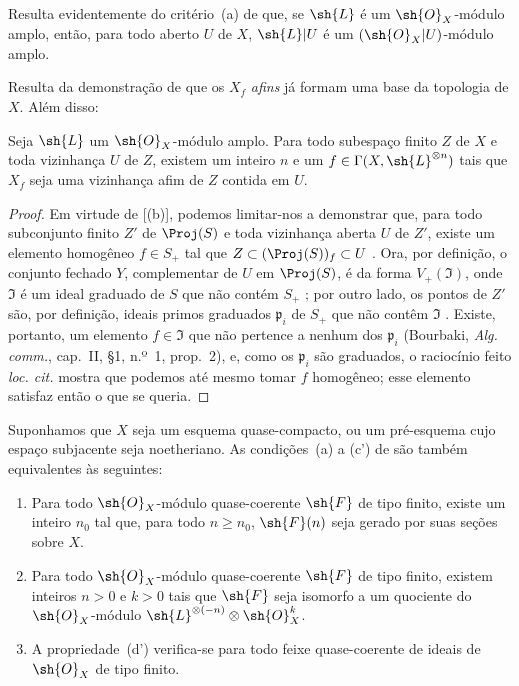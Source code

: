 \documentclass[oneside,10pt]{amsart}
\renewcommand{\geq}{\geqslant}
\newcommand{\oldpage}[2][]{\marginnote{\normalfont\footnotesize\textbf{#1}~|~#2}\ignorespaces}
\let\EGAOriginalLabel\label
\renewcommand{\label}[1]{\phantomsection\EGAOriginalLabel{#1}}
\begin{document}
Resulta evidentemente do critério~(a) de  que, se $\sh{L}$ é um $\sh{O}_X$-módulo amplo, então, para todo aberto $U$ de $X$, $\sh{L}|U$ é um $(\sh{O}_X|U)$-módulo amplo.

Resulta da demonstração de  que os $X_f$ \emph{afins} já formam uma base da topologia de $X$.
Além disso:

\begin{corollary}[4.5.4]
\label{II.4.5.4}
Seja $\sh{L}$ um $\sh{O}_X$-módulo amplo.
Para todo subespaço finito $Z$ de $X$ e toda vizinhança $U$ de $Z$, existem um inteiro $n$ e um $f\in\Gamma(X,\sh{L}^{\otimes n})$ tais que $X_f$ seja uma vizinhança afim de $Z$ contida em $U$.
\end{corollary}

\begin{proof}
\oldpage[II]{85}
Em virtude de [(b)], podemos limitar-nos a demonstrar que, para todo subconjunto finito $Z'$ de $\Proj(S)$ e toda vizinhança aberta $U$ de $Z'$, existe um elemento homogêneo $f\in S_+$ tal que $Z\subset(\Proj(S))_f\subset U$ .
Ora, por definição, o conjunto fechado $Y$, complementar de $U$ em $\Proj(S)$, é da forma $V_+(\mathfrak{I})$, onde $\mathfrak{I}$ é um ideal graduado de $S$ que não contém $S_+$ ;
por outro lado, os pontos de $Z'$ são, por definição, ideais primos graduados $\mathfrak{p}_i$ de $S_+$ que não contêm $\mathfrak{I}$ .
Existe, portanto, um elemento $f\in\mathfrak{I}$ que não pertence a nenhum dos $\mathfrak{p}_i$ (Bourbaki, \emph{Alg. comm.}, cap.~II, \S1, n.º~1, prop.~2), e, como os $\mathfrak{p}_i$ são graduados, o raciocínio feito \emph{loc. cit.} mostra que podemos até mesmo tomar $f$ homogêneo;
esse elemento satisfaz então o que se queria.
\end{proof}

\begin{proposition}[4.5.5]
\label{II.4.5.5}
Suponhamos que $X$ seja um esquema quase-compacto, ou um pré-esquema cujo espaço subjacente seja noetheriano.
As condições~(a) a (c') de  são também equivalentes às seguintes:
\begin{enumerate}
  \item[\rm{(d)}] Para todo $\sh{O}_X$-módulo quase-coerente $\sh{F}$ de tipo finito, existe um inteiro $n_0$ tal que, para todo $n\geq n_0$, $\sh{F}(n)$ seja gerado por suas seções sobre $X$.
  \item[\rm{(d')}] Para todo $\sh{O}_X$-módulo quase-coerente $\sh{F}$ de tipo finito, existem inteiros $n>0$ e $k>0$ tais que $\sh{F}$ seja isomorfo a um quociente do $\sh{O}_X$-módulo $\sh{L}^{\otimes(-n)}\otimes\sh{O}_X^k$.
  \item[\rm{(d'')}] A propriedade~(d') verifica-se para todo feixe quase-coerente de ideais de $\sh{O}_X$ de tipo finito.
\end{enumerate}
\end{proposition}
\end{document}
